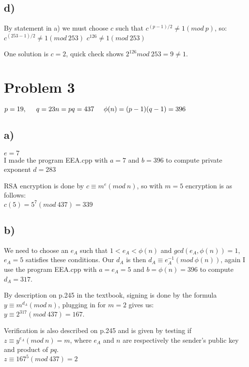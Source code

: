 \documentclass{article}
\begin{document}
\subsection*{d)}
By statement in a) we must choose $c$ such that $c^{(p-1)/2} \neq 1(mod \: p)$, so:\\
$c^{(253-1)/2} \neq 1 (mod \: 253)$
$c^{126} \neq 1 (mod \: 253)$

One solution is $c=2$, quick check shows $2^{126} mod \: 253 = 9 \neq 1$.

\section*{Problem 3}

$p = 19, \hspace{5 mm} q = 23\\
n = pq = 437 \hspace{5 mm} \phi(n) = (p-1)(q-1) = 396$

\subsection*{a)}
$e = 7$\\
I made the program EEA.cpp with $a=7$ and $b=396$ to compute private exponent $d=283$

RSA encryption is done by $c \equiv m^{e}(mod \: n)$, so with $m=5$ encryption is as follows:\\
$c(5) = 5^{7}(mod \: 437) = 339$

\subsection*{b)}

We need to choose an $e_{A}$ such that $1 < e_{A} < \phi(n)$ and $gcd(e_{A}, \phi(n)) = 1$, $e_{A} = 5$ satisfies these conditions. Our $d_{A}$ is then $d_{A} \equiv e_{A}^{-1} (mod \: \phi(n))$, again I use the program EEA.cpp with $a=e_{A}=5$ and $b=\phi(n)=396$ to compute $d_{A}=317$.

By description on p.245 in the textbook, signing is done by the formula $y \equiv m^{d_{A}} (mod \: n)$, plugging in for $m=2$ gives us:\\
$y \equiv 2^{317} (mod \: 437) = 167$.

Verification is also described on p.245 and is given by testing if $z \equiv y^{e_{A}} (mod \: n) = m$, where $e_{A}$ and $n$ are respectively the sender's public key and product of $pq$.\\
$z \equiv 167^{5} (mod \: 437) = 2$
\end{document}

